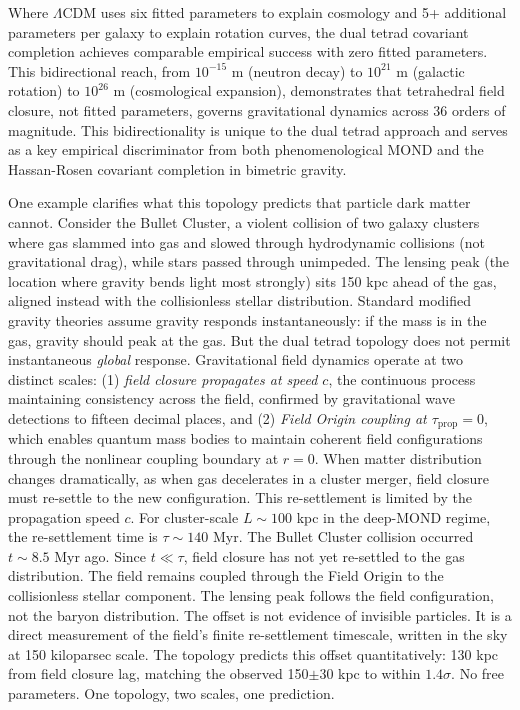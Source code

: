 \documentclass[aps,prd,preprint,superscriptaddress,showpacs,preprintnumbers,amsmath,amssymb,nofootinbib]{revtex4-2}
\begin{document}
Where $\Lambda$CDM uses six fitted parameters to explain cosmology and 5+ additional parameters per galaxy to explain rotation curves, the dual tetrad covariant completion achieves comparable empirical success with zero fitted parameters. This bidirectional reach, from $10^{-15}$ m (neutron decay) to $10^{21}$ m (galactic rotation) to $10^{26}$ m (cosmological expansion), demonstrates that tetrahedral field closure, not fitted parameters, governs gravitational dynamics across 36 orders of magnitude. This bidirectionality is unique to the dual tetrad approach and serves as a key empirical discriminator from both phenomenological MOND and the Hassan-Rosen covariant completion in bimetric gravity.

One example clarifies what this topology predicts that particle dark matter cannot. Consider the Bullet Cluster, a violent collision of two galaxy clusters where gas slammed into gas and slowed through hydrodynamic collisions (not gravitational drag), while stars passed through unimpeded. The lensing peak (the location where gravity bends light most strongly) sits 150 kpc ahead of the gas, aligned instead with the collisionless stellar distribution. Standard modified gravity theories assume gravity responds instantaneously: if the mass is in the gas, gravity should peak at the gas. But the dual tetrad topology does not permit instantaneous \emph{global} response. Gravitational field dynamics operate at two distinct scales: (1) \emph{field closure propagates at speed $c$}, the continuous process maintaining consistency across the field, confirmed by gravitational wave detections to fifteen decimal places, and (2) \emph{Field Origin coupling at $\tau_{\text{prop}} = 0$}, which enables quantum mass bodies to maintain coherent field configurations through the nonlinear coupling boundary at $r = 0$. When matter distribution changes dramatically, as when gas decelerates in a cluster merger, field closure must re-settle to the new configuration. This re-settlement is limited by the propagation speed $c$. For cluster-scale $L \sim 100$ kpc in the deep-MOND regime, the re-settlement time is $\tau \sim 140$ Myr. The Bullet Cluster collision occurred $t \sim 8.5$ Myr ago. Since $t \ll \tau$, field closure has not yet re-settled to the gas distribution. The field remains coupled through the Field Origin to the collisionless stellar component. The lensing peak follows the field configuration, not the baryon distribution. The offset is not evidence of invisible particles. It is a direct measurement of the field's finite re-settlement timescale, written in the sky at 150 kiloparsec scale. The topology predicts this offset quantitatively: 130 kpc from field closure lag, matching the observed 150$\pm$30 kpc to within $1.4\sigma$. No free parameters. One topology, two scales, one prediction.
\end{document}
